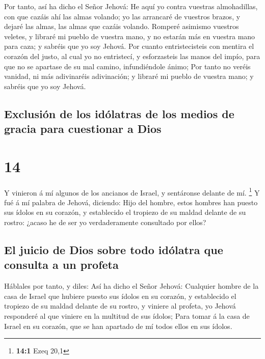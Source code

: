  Por tanto, así ha dicho el Señor Jehová: He aquí yo
contra vuestras almohadillas, con que cazáis ahí las almas volando; yo
las arrancaré de vuestros brazos, y dejaré las almas, las almas que
cazáis volando.  Romperé asimismo vuestros veletes, y
libraré mi pueblo de vuestra mano, y no estarán más en vuestra mano para
caza; y sabréis que yo soy Jehová.  Por cuanto
entristecisteis con mentira el corazón del justo, al cual yo no
entristecí, y esforzasteis las manos del impío, para que no se apartase
de su mal camino, infundiéndole ánimo;  Por tanto no
veréis vanidad, ni más adivinaréis adivinación; y libraré mi pueblo de
vuestra mano; y sabréis que yo soy Jehová.

\hypertarget{exclusiuxf3n-de-los-iduxf3latras-de-los-medios-de-gracia-para-cuestionar-a-dios}{%
\subsection{Exclusión de los idólatras de los medios de gracia para
cuestionar a
Dios}\label{exclusiuxf3n-de-los-iduxf3latras-de-los-medios-de-gracia-para-cuestionar-a-dios}}

\hypertarget{section-13}{%
\section{14}\label{section-13}}

 Y vinieron á mí algunos de los ancianos de Israel, y
sentáronse delante de mí. \footnote{\textbf{14:1} Ezeq 20,1}
 Y fué á mí palabra de Jehová, diciendo: 
Hijo del hombre, estos hombres han puesto sus ídolos en su corazón, y
establecido el tropiezo de su maldad delante de su rostro: ¿acaso he de
ser yo verdaderamente consultado por ellos?

\hypertarget{el-juicio-de-dios-sobre-todo-iduxf3latra-que-consulta-a-un-profeta}{%
\subsection{El juicio de Dios sobre todo idólatra que consulta a un
profeta}\label{el-juicio-de-dios-sobre-todo-iduxf3latra-que-consulta-a-un-profeta}}

 Háblales por tanto, y diles: Así ha dicho el Señor
Jehová: Cualquier hombre de la casa de Israel que hubiere puesto sus
ídolos en su corazón, y establecido el tropiezo de su maldad delante de
su rostro, y viniere al profeta, yo Jehová responderé al que viniere en
la multitud de sus ídolos;  Para tomar á la casa de Israel
en su corazón, que se han apartado de mí todos ellos en sus ídolos.

